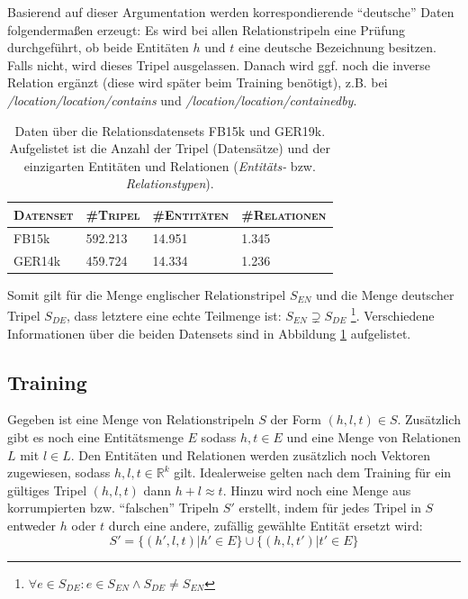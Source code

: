 Basierend auf dieser Argumentation werden korrespondierende ``deutsche'' Daten folgendermaßen erzeugt:
Es wird bei allen Relationstripeln eine Prüfung durchgeführt, ob beide Entitäten $h$ und $t$ eine deutsche Bezeichnung
besitzen. Falls nicht, wird dieses Tripel ausgelassen. Danach wird ggf. noch die inverse Relation ergänzt (diese wird
später beim Training benötigt), z.B. bei \emph{/location/location/contains} und \emph{/location/location/containedby}.

\begin{table}[h]
  \centering
  \def\arraystretch{1.5}
  \begin{tabular}{@{}llll@{}}
    \toprule
    \textsc{Datenset} & \textsc{\#Tripel} & \textsc{\#Entitäten} & \textsc{\#Relationen} \\
    \toprule
    FB15k & 592.213 & 14.951 & 1.345 \\
    GER14k & 459.724 & 14.334 & 1.236 \\
    \bottomrule
  \end{tabular}
  \caption[Daten über die Relationsdatensets FB15k und GER14k]{Daten über die Relationsdatensets FB15k und GER19k.
  Aufgelistet ist die Anzahl der Tripel (Datensätze) und der einzigarten Entitäten und Relationen (\emph{Entitäts-} bzw.
  \emph{Relationstypen}).\label{fig:fb15kger14k}}
\end{table}

Somit gilt für die Menge englischer Relationstripel $S_{EN}$ und die Menge deutscher Tripel $S_{DE}$, dass letztere
eine echte Teilmenge ist: $S_{EN} \supsetneq S_{DE}$ \footnote{$\forall e \in S_{DE}: e \in S_{EN} \wedge S_{DE} \neq S_{EN}$}.
Verschiedene Informationen über die beiden Datensets sind in Abbildung \ref{fig:fb15kger14k} aufgelistet.

\subsection{Training}

Gegeben ist eine Menge von Relationstripeln $S$ der Form $(h, l, t) \in S$. Zusätzlich gibt es noch eine Entitätsmenge
$E$ sodass $h, t \in E$ und eine Menge von Relationen $L$ mit $l \in L$. Den Entitäten und Relationen werden zusätzlich
noch Vektoren zugewiesen, sodass $h, l, t \in \mathbb{R}^k$ gilt. Idealerweise gelten nach dem Training für ein gültiges Tripel $(h, l, t)$
dann $h + l \approx t$. Hinzu wird noch eine Menge aus korrumpierten bzw. ``falschen'' Tripeln $S'$ erstellt, indem
für jedes Tripel in $S$ entweder $h$ oder $t$ durch eine andere, zufällig gewählte Entität ersetzt wird:
\begin{equation}
  S' = \{(h', l, t) | h' \in E\} \cup \{(h, l, t') | t' \in E\}
\end{equation}

